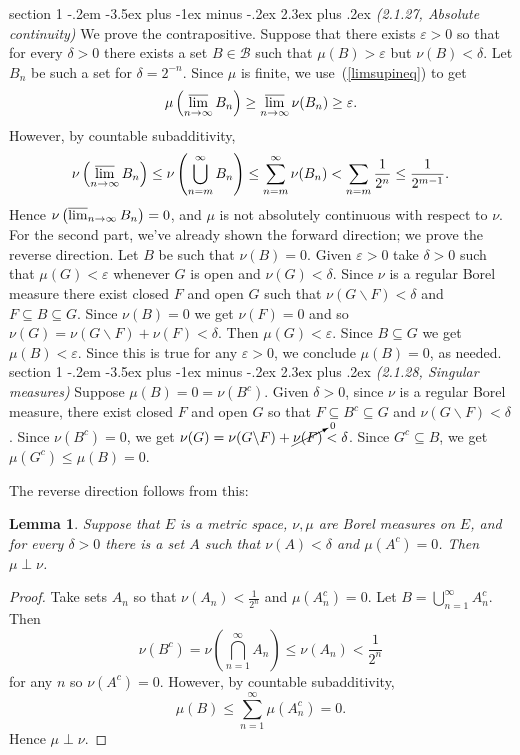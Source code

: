 \documentclass[12pt]{article}
\makeatletter
\theoremstyle{norm}
\newtheorem{lem}[thm]{Lemma}
\providecommand{\cal}[1]{\mathcal{#1}}
\renewcommand{\cal}[1]{\mathcal{#1}}
\newcommand{\rc}[1]{\frac{1}{#1}}
\newcommand{\subeq}[0]{\subseteq}
\newcommand{\de}[0]{\delta}
\newcommand{\ep}[0]{\varepsilon}
\newcommand{\pa}[1]{\left( {#1} \right)}
\newcommand{\bs}[0]{\backslash}
\newenvironment{problem}{\@startsection
       {section}
       {1}
       {-.2em}
       {-3.5ex plus -1ex minus -.2ex}
       {2.3ex plus .2ex}
       {\pagebreak[3]%
       \large\bf\noindent{Problem }
       }
       }
       {%
       }
\makeatother
\begin{document}
\begin{problem} {\it (2.1.27, Absolute continuity)}
We prove the contrapositive. Suppose that there exists $\ep>0$ so that for every $\de>0$ there exists a set $B\in \cal B$ such that $\mu(B)>\ep$ but $\nu(B)<\de$. Let $B_n$ be such a set for $\de=2^{-n}$. 
Since $\mu$ is finite, we use~(\ref{limsupineq}) to get
\[
\mu\pa{\varlimsup_{n\to \infty} B_n}
\geq \varlimsup_{n\to \infty}\nu(B_n)\geq \ep.
\]
However, by countable subadditivity,
\[
\nu\pa{\varlimsup_{n\to \infty} B_n}\leq \nu\pa{\bigcup_{n=m}^{\infty} B_n}\leq \sum_{n=m}^{\infty} \nu(B_n)
<\sum_{n=m}\rc{2^n}
\leq \rc{2^{m-1}}.
\]
Hence $\nu\pa{\varlimsup_{n\to \infty} B_n}=0$, and $\mu$ is not absolutely continuous with respect to $\nu$.\\

For the second part, we've already shown the forward direction; we prove the reverse direction. Let $B$ be such that $\nu(B)=0$. Given $\ep>0$ take $\de>0$ such that $\mu(G)<\ep$ whenever $G$ is open and $\nu(G)<\de$. 
Since $\nu$ is a regular Borel measure there exist closed $F$ and open $G$ such that $\nu(G\bs F)<\de$ and $F\subeq B\subeq G$. Since $\nu(B)=0$ we get $\nu(F)=0$ and so $\nu(G)=\nu(G\bs F)+\nu(F)<\de$. Then $\mu(G)<\ep$. Since $B\subeq G$ we get $\mu(B)< \ep$. Since this is true for any $\ep>0$, we conclude $\mu(B)=0$, as needed.
\end{problem}
\begin{problem} {\it (2.1.28, Singular measures)}
Suppose $\mu(B)=0=\nu(B^c)$.
Given $\de>0$, since $\nu$ is a regular Borel measure, there exist closed $F$ and open $G$ so that $F\subeq  B^c\subeq G$ and $\nu(G\bs F)<\de$.
Since $\nu(B^c)=0$, we get $\nu(G)=\nu(G\bs F)+\cancelto{0}{\nu(F)}<\de$.
Since $G^c\subeq B$, we get $\mu(G^c)\leq \mu(B)=0$.

The reverse direction follows from this:
\begin{lem}\label{singcrit}
Suppose that $E$ is a metric space, $\nu,\mu$ are Borel measures on $E$, and %
for every $\de>0$ there is a set $A$ such that $\nu(A)<\de$ and $\mu(A^c)=0$. Then $\mu\perp \nu$.
\end{lem}
\begin{proof}
Take sets $A_n$ so that $\nu(A_n)<\rc{2^n}$ and $\mu(A_n^c)=0$. Let $B=\bigcup_{n=1}^{\infty} A_n^c$. Then
\[
\nu(B^c)=
\nu\pa{\bigcap_{n=1}^{\infty} A_n}
\leq \nu(A_n)< \rc{2^n}
\]
for any $n$ so $\nu(A^c)=0$. However, by countable subadditivity,
\[
\mu(B)\leq \sum_{n=1}^{\infty} \mu(A_n^c)=0.
\]
Hence $\mu\perp \nu$.
\end{proof}

\end{problem}
\end{document}
